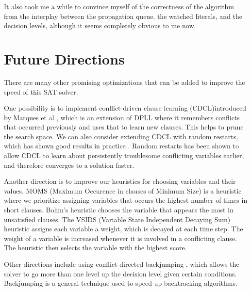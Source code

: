 \documentclass[11pt]{article}
\begin{document}
It also took me a while to convince myself of the correctness of the algorithm from the interplay between the propagation queue, the watched literals, and the decision levels, although it seems completely obvious to me now.

\section{Future Directions}

There are many other promising optimizations that can be added to improve the speed of this SAT solver. 

One possibility is to implement conflict-driven clause learning (CDCL)introduced by Marques et al \cite{handbook_sat}, which is an extension of DPLL where it remembers conflicts that occurred previously and uses that to learn new clauses. This helps to prune the search space. We can also consider extending CDCL with random restarts, which has shown good results in practice \cite{restarts}. Random restarts has been shown to allow CDCL to learn about persistently troublesome conflicting variables earlier, and therefore converges to a solution faster.

Another direction is to improve our heuristics for choosing variables and their values. MOMS (Maximum Occurence in clauses of Minimum Size) is a heuristic where we prioritize assigning variables that occurs the highest number of times in short clauses. Bohm's heuristic chooses the variable that appears the most in unsatisfied clauses. The VSIDS (Variable State Independent Decaying Sum) heuristic assigns each variable a weight, which is decayed at each time step. The weight of a variable is increased whenever it is involved in a conflicting clause. The heuristic then selects the variable with the highest score.

Other directions include using conflict-directed backjumping \cite{backtrace}, which allows the solver to go more than one level up the decision level given certain conditions. Backjumping is a general technique used to speed up backtracking algorithms. 




\newpage



\end{document}
